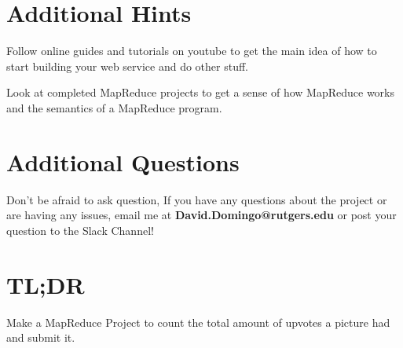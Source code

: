 \documentclass{article}
\begin{document}
\section*{Additional Hints} %
\begin{info}
Follow online guides and tutorials on youtube to get the main idea of how to start building your web service and do other stuff.
\end{info}
\begin{info}
Look at completed MapReduce projects to get a sense of how MapReduce works and the semantics of a MapReduce program.
\end{info}



\section*{Additional Questions} %
Don't be afraid to ask question, If you have any questions about the project or are having any issues, email me at \textbf{David.Domingo@rutgers.edu} or post your question to the Slack Channel!

\section*{TL;DR}
Make a MapReduce Project to count the total amount of upvotes a picture had and submit it. 

%
\end{document}

